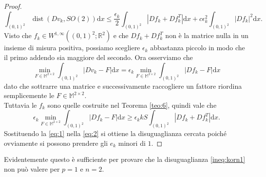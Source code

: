 \documentclass[a4paper,11pt]{book}
\theoremstyle{plain}
\theoremstyle{definition}
\theoremstyle{remark}
\newcommand{\R}{\mathbb{R}}
\newcommand{\M}{\mathbb{M}}
\newcommand{\dx}{\text{d}x}
\DeclareMathOperator{\Id}{Id}
\DeclareMathOperator{\dist}{dist}
\newcommand{\boh}{\textcolor{red}{\Huge\textbf{???}}}
\begin{document}
\begin{proof}
\begin{equation}
		\int_{(0,1)^2}\dist(Dv_k,SO(2))\dx\leq \frac{\epsilon_k}{2}\int_{(0,1)^2}|Df_k+Df_k^T|\dx+c\epsilon_k^2\int_{(0,1)^2}|Df_k|^2\dx.
	\end{equation}
	Visto che $f_k\in W^{1,\infty}((0,1)^2;\R^2)$ e che $Df_k+Df_k^T$ non è la matrice nulla in un insieme di misura positiva, possiamo scegliere $\epsilon_k$ abbastanza piccolo in modo che il primo addendo sia maggiore del secondo. Ora osserviamo che
	\[
		\min_{F\in\M^{2\times 2}}\int_{(0,1)^2}|Dv_k-F|\dx = \epsilon_k\min_{F\in\M^{2\times 2}}\int_{(0,1)^2}|Df_k-F|\dx
	\]
	dato che sottrarre una matrice e successivamente raccogliere un fattore riordina semplicemente le $F\in\M^{2\times 2}$.\\
	Tuttavia le $f_k$ sono quelle costruite nel Teorema \ref{teo:6}, quindi vale che
	\begin{equation}\label{eq:2}
		\epsilon_k\min_{F\in\M^{2\times 2}}\int_{(0,1)^2}|Df_k-F|\dx \geq \epsilon_kkS\int_{(0,1)^2}|Df_k+Df_k^T|\dx.
	\end{equation}
	Sostituendo la \eqref{eq:1} nella \eqref{eq:2} si ottiene la disuguaglianza cercata poiché ovviamente si possono prendere gli $e_k$ minori di $1$.\begin{comment}\\
	Se ora $n\geq 2$ è generico allora possiamo adattare le funzioni appena trovate per ottenere un risultato simile: definiamo $\widetilde{v}_k(x_1,\ldots,x_n) = v_k(x_1,x_2)+(0,0,x_3,\ldots,x_n)$, in tal modo si ha che
	\begin{align*}
		D\widetilde{v}_k(x) = \begin{pmatrix}[c|c]
	                      	Dv_k(x)&0\\
	                      	\hline
	                      	0&\Id\\
	                      \end{pmatrix},
	\end{align*}
	così, data $\widetilde{Q}=\begin{pmatrix}[c|c]
	                         	Q&0\\
	                         	\hline
	                         	0&\Id\\
	                         \end{pmatrix}$ con $Q\in SO(2)$ ($\widetilde{Q}\in SO(n)$), si ha che $|D\widetilde{v}_k-\widetilde{Q}|=|Dv_k-Q|$, ma per quest'ultima
	quantità abbiamo la stima data prima, inoltre, dato che $SO(n)$ è limitato in $\M^{n\times n}$, presa una qualsiasi $R\in SO(n)$ e una qualsiasi $\widetilde{Q}$ come sopra, vale che $|\widetilde{Q}-R|\leq C$ per qualche costante $C > 0$, così si ottiene che
	\[
		\forall\  R\in SO(n)\qquad\int_{(0,1)^n}|D\widetilde{v}_k-R|\dx\geq k\int_{(0,1)^n}\dist(D\widetilde{v}_k,SO(n))\dx- C.
	\]\end{comment}
\end{proof}	
Evidentemente questo è sufficiente per provare che la disuguaglianza \eqref{ineq:korn1} non può valere per $p=1$ e $n=2$.
	
\end{document}
